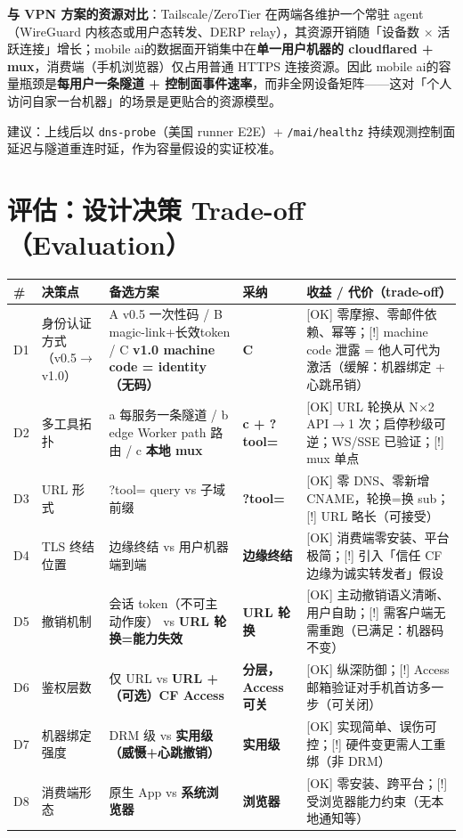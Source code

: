 \documentclass[10pt,a4paper]{article}
\newcommand{\sys}{mobile ai}
\begin{document}
\noindent\textbf{与 VPN 方案的资源对比}：Tailscale/ZeroTier 在两端各维护一个常驻 agent（WireGuard 内核态或用户态转发、DERP relay），其资源开销随「设备数 $\times$ 活跃连接」增长；\sys 的数据面开销集中在\textbf{单一用户机器的 cloudflared + mux}，消费端（手机浏览器）仅占用普通 HTTPS 连接资源。因此 \sys 的容量瓶颈是\textbf{每用户一条隧道 + 控制面事件速率}，而非全网设备矩阵——这对「个人访问自家一台机器」的场景是更贴合的资源模型。

\noindent 建议：上线后以 \texttt{dns-probe}（美国 runner E2E）+ \texttt{/mai/healthz} 持续观测控制面延迟与隧道重连时延，作为容量假设的实证校准。

\section{评估：设计决策 Trade-off（Evaluation）}

\begin{longtable}{@{}p{0.6cm}p{2.3cm}p{3.8cm}p{2.5cm}p{5.3cm}@{}}
\toprule
\# & 决策点 & 备选方案 & 采纳 & 收益 / 代价（trade-off）\\
\midrule
D1 & 身份认证方式（v0.5$\rightarrow$v1.0） & A v0.5 一次性码 / B magic-link+长效token / C \textbf{v1.0 machine code = identity（无码）} & \textbf{C} & [OK] 零摩擦、零邮件依赖、幂等；[!] machine code 泄露 = 他人可代为激活（缓解：机器绑定 + 心跳吊销）\\
\addlinespace[2pt]
D2 & 多工具拓扑 & a 每服务一条隧道 / b edge Worker path 路由 / c \textbf{本地 mux} & \textbf{c + ?tool=} & [OK] URL 轮换从 N$\times$2 API$\rightarrow$1 次；启停秒级可逆；WS/SSE 已验证；[!] mux 单点\\
\addlinespace[2pt]
D3 & URL 形式 & ?tool= query vs 子域前缀 & \textbf{?tool=} & [OK] 零 DNS、零新增 CNAME，轮换=换 sub；[!] URL 略长（可接受）\\
\addlinespace[2pt]
D4 & TLS 终结位置 & 边缘终结 vs 用户机器端到端 & \textbf{边缘终结} & [OK] 消费端零安装、平台极简；[!] 引入「信任 CF 边缘为诚实转发者」假设\\
\addlinespace[2pt]
D5 & 撤销机制 & 会话 token（不可主动作废） vs \textbf{URL 轮换=能力失效} & \textbf{URL 轮换} & [OK] 主动撤销语义清晰、用户自助；[!] 需客户端无需重跑（已满足：机器码不变）\\
\addlinespace[2pt]
D6 & 鉴权层数 & 仅 URL vs \textbf{URL +（可选）CF Access} & \textbf{分层，Access 可关} & [OK] 纵深防御；[!] Access 邮箱验证对手机首访多一步（可关闭）\\
\addlinespace[2pt]
D7 & 机器绑定强度 & DRM 级 vs \textbf{实用级（威慑+心跳撤销）} & \textbf{实用级} & [OK] 实现简单、误伤可控；[!] 硬件变更需人工重绑（非 DRM）\\
\addlinespace[2pt]
D8 & 消费端形态 & 原生 App vs \textbf{系统浏览器} & \textbf{浏览器} & [OK] 零安装、跨平台；[!] 受浏览器能力约束（无本地通知等）\\
\bottomrule
\end{longtable}
\end{document}
